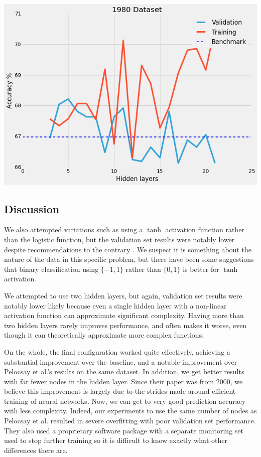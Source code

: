 \documentclass[a4paper]{article}
\theoremstyle{plain}
\begin{document}
\begin{center}\vspace{1cm}
\includegraphics[width=0.9\linewidth]{1980}
\end{center}\vspace{1cm}

\subsection{Discussion}

We also attempted variations such as using a $\tanh$ activation function rather than the logistic function, but the validation set results were notably lower despite recommendations to the contrary \cite{lecun-98b}. We suspect it is something about the nature of the data in this specific problem, but there have been some suggestions that binary classification using $\{-1, 1\}$ rather than $\{0, 1\}$ is better for $\tanh$ activation.\cite{lecun-98b}

We attempted to use two hidden layers, but again, validation set results were notably lower likely because even a single hidden layer with a non-linear activation function can approximate significant complexity. Having more than two hidden layers rarely improves performance, and often makes it worse, even though it can theoretically approximate more complex functions. \cite{bengio2007scaling}

On the whole, the final configuration worked quite effectively, achieving a substantial improvement over the baseline, and a notable improvement over Pelocsay et al.'s results on the same dataset. In addition, we get better results with far fewer nodes in the hidden layer. Since their paper was from 2000, we believe this improvement is largely due to the strides made around efficient training of neural networks. Now, we can get to very good prediction accuracy with less complexity. Indeed, our experiments to use the same number of nodes as Pelocsay et al. resulted in severe overfitting with poor validation set performance. They also used a proprietary software package with a separate monitoring set used to stop further training so it is difficult to know exactly what other differences there are.
\end{document}
